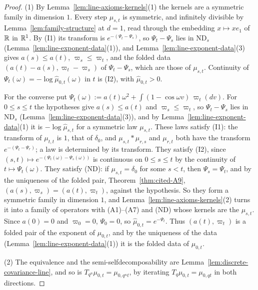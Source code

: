\begin{proof}
\leanok
{}
(1) By Lemma~\ref{lem:line-axioms-kernels}(1) the kernels are a symmetric family in dimension
$1$. Every step $\mu_{s,t}$ is symmetric, and infinitely divisible by
Lemma~\ref{lem:family-structure} at $d = 1$, read through the embedding $x \mapsto xe_1$ of $\mathbb{R}$
in $\mathbb{R}^1$. By (I1) its transform is $e^{-(\Psi_t - \Psi_s)}$, so $\Psi_t - \Psi_s$ lies in
$\mathrm{ND}_s$ (Lemma~\ref{lem:line-exponent-data}(1)), and Lemma~\ref{lem:line-exponent-data}(3)
gives $a(s) \le a(t)$, $\varpi_s \le \varpi_t$, and the folded data
$(a(t) - a(s), \varpi_t - \varpi_s)$ of $\Psi_t - \Psi_s$, which are those of $\mu_{s,t}$.
Continuity of $\Psi_t(\omega) = -\log\widehat\mu_{0,t}(\omega)$ in $t$ is (I2), with
$\widehat\mu_{0,t} > 0$.

For the converse put $\Psi_t(\omega) := a(t)\omega^2 + \int(1 - \cos\omega v)\,\varpi_t(dv)$. For
$0 \le s \le t$ the hypotheses give $a(s) \le a(t)$ and $\varpi_s \le \varpi_t$, so
$\Psi_t - \Psi_s$ lies in $\mathrm{ND}_s$ (Lemma~\ref{lem:line-exponent-data}(3)), and by
Lemma~\ref{lem:line-exponent-data}(1) it is $-\log\widehat\mu_{s,t}$ for a symmetric law
$\mu_{s,t}$. These laws satisfy (I1): the transform of $\mu_{t,t}$ is $1$, that of $\delta_0$,
and $\mu_{s,t} * \mu_{r,s}$ and $\mu_{r,t}$ both have the transform $e^{-(\Psi_t - \Psi_r)}$; a law
is determined by its transform. They satisfy (I2), since
$(s,t) \mapsto e^{-(\Psi_t(\omega) - \Psi_s(\omega))}$ is continuous on $0 \le s \le t$ by the
continuity of $t \mapsto \Psi_t(\omega)$. They satisfy (ND): if $\mu_{s,t} = \delta_0$ for some
$s < t$, then $\Psi_s = \Psi_t$, and by the uniqueness of the folded pair, Theorem~\ref{thm:cited-A9},
$(a(s), \varpi_s) = (a(t), \varpi_t)$, against the hypothesis. So they form a symmetric family in
dimension $1$, and Lemma~\ref{lem:line-axioms-kernels}(2) turns it into a family of operators with
(A1)--(A7) and (ND) whose kernels are the $\mu_{s,t}$. Since $a(0) = 0$ and $\varpi_0 = 0$,
$\Psi_0 = 0$, so $\widehat\mu_{0,t} = e^{-\Psi_t}$. Thus $(a(t), \varpi_t)$ is a folded pair of
the exponent of $\mu_{0,t}$, and by the uniqueness of the data
(Lemma~\ref{lem:line-exponent-data}(1)) it is the folded data of $\mu_{0,t}$.

(2) The equivalence and the semi-selfdecomposability are
Lemma~\ref{lem:discrete-covariance-line}, and so is $T_{q^n}\mu_{0,t} = \mu_{0,q^nt}$, by
iterating $T_q\mu_{0,t} = \mu_{0,qt}$ in both directions.


\end{proof}
